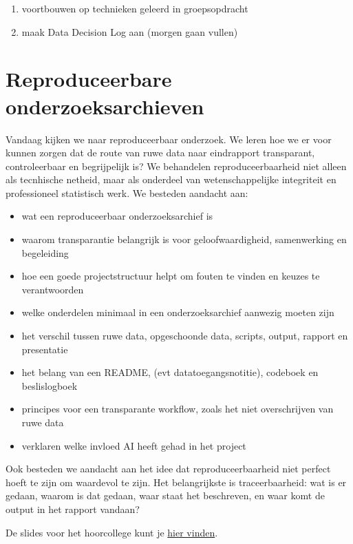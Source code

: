 \documentclass[
  letterpaper,
  DIV=11,
  numbers=noendperiod]{scrreprt}
\providecommand{\tightlist}{%
  \setlength{\itemsep}{0pt}\setlength{\parskip}{0pt}}
\begin{document}
\begin{enumerate}
\def\labelenumi{\arabic{enumi}.}
\tightlist
\item
  voortbouwen op technieken geleerd in groepsopdracht
\item
  maak Data Decision Log aan (morgen gaan vullen)
\end{enumerate}


\chapter{Reproduceerbare onderzoeksarchieven}\label{sec-mt4}

\begin{tcolorbox}[enhanced jigsaw, arc=.35mm, bottomrule=.15mm, bottomtitle=1mm, breakable, colback=white, colbacktitle=quarto-callout-tip-color!10!white, colframe=quarto-callout-tip-color-frame, coltitle=black, left=2mm, leftrule=.75mm, opacityback=0, opacitybacktitle=0.6, rightrule=.15mm, title=\textcolor{quarto-callout-tip-color}{\faLightbulb}\hspace{0.5em}{Hoorcollege 19 juni 2026}, titlerule=0mm, toprule=.15mm, toptitle=1mm]

Vandaag kijken we naar reproduceerbaar onderzoek. We leren hoe we er
voor kunnen zorgen dat de route van ruwe data naar eindrapport
transparant, controleerbaar en begrijpelijk is? We behandelen
reproduceerbaarheid niet alleen als tecnhische netheid, maar als
onderdeel van wetenschappelijke integriteit en professioneel statistisch
werk. We besteden aandacht aan:

\begin{itemize}
\tightlist
\item
  wat een reproduceerbaar onderzoeksarchief is
\item
  waarom transparantie belangrijk is voor geloofwaardigheid,
  samenwerking en begeleiding
\item
  hoe een goede projectstructuur helpt om fouten te vinden en keuzes te
  verantwoorden
\item
  welke onderdelen minimaal in een onderzoeksarchief aanwezig moeten
  zijn
\item
  het verschil tussen ruwe data, opgeschoonde data, scripts, output,
  rapport en presentatie
\item
  het belang van een README, (evt datatoegangsnotitie), codeboek en
  beslislogboek
\item
  principes voor een transparante workflow, zoals het niet overschrijven
  van ruwe data
\item
  verklaren welke invloed AI heeft gehad in het project
\end{itemize}

Ook besteden we aandacht aan het idee dat reproduceerbaarheid niet
perfect hoeft te zijn om waardevol te zijn. Het belangrijkste is
traceerbaarheid: wat is er gedaan, waarom is dat gedaan, waar staat het
beschreven, en waar komt de output in het rapport vandaan?

De slides voor het hoorcollege kunt je \href{slides/lec-3.html}{hier
vinden}.

\end{tcolorbox}
\end{document}
